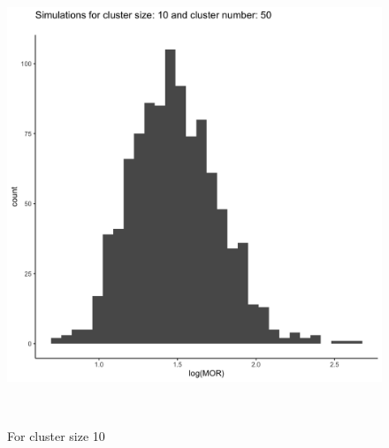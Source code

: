 \documentclass[
  letterpaper,
  DIV=11,
  numbers=noendperiod,
  titlepage]{scrartcl}
\begin{document}
\begin{figure}
\begin{minipage}[t]{0.50\linewidth}
{{\includegraphics{../plots/ran-int/hist_50_10.png}

}

\caption{For cluster size 10}

}

\end{minipage}%
\newline
\begin{minipage}[t]{\linewidth}

{\centering 

~

}

\end{minipage}%
\newline
\begin{minipage}[t]{0.50\linewidth}

{\centering 

\raisebox{-\height}{

}}
\end{minipage}
\end{figure}
\end{document}
